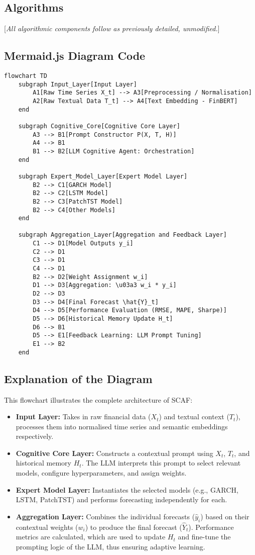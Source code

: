\documentclass[conference]{IEEEtran}
\begin{document}
\subsection{Algorithms}
[\emph{All algorithmic components follow as previously detailed, unmodified.}]

\subsection{Mermaid.js Diagram Code}
\begin{verbatim}
flowchart TD
    subgraph Input_Layer[Input Layer]
        A1[Raw Time Series X_t] --> A3[Preprocessing / Normalisation]
        A2[Raw Textual Data T_t] --> A4[Text Embedding - FinBERT]
    end

    subgraph Cognitive_Core[Cognitive Core Layer]
        A3 --> B1[Prompt Constructor P(X, T, H)]
        A4 --> B1
        B1 --> B2[LLM Cognitive Agent: Orchestration]
    end

    subgraph Expert_Model_Layer[Expert Model Layer]
        B2 --> C1[GARCH Model]
        B2 --> C2[LSTM Model]
        B2 --> C3[PatchTST Model]
        B2 --> C4[Other Models]
    end

    subgraph Aggregation_Layer[Aggregation and Feedback Layer]
        C1 --> D1[Model Outputs y_i]
        C2 --> D1
        C3 --> D1
        C4 --> D1
        B2 --> D2[Weight Assignment w_i]
        D1 --> D3[Aggregation: \u03a3 w_i * y_i]
        D2 --> D3
        D3 --> D4[Final Forecast \hat{Y}_t]
        D4 --> D5[Performance Evaluation (RMSE, MAPE, Sharpe)]
        D5 --> D6[Historical Memory Update H_t]
        D6 --> B1
        D5 --> E1[Feedback Learning: LLM Prompt Tuning]
        E1 --> B2
    end
\end{verbatim}

\subsection{Explanation of the Diagram}
This flowchart illustrates the complete architecture of SCAF:
\begin{itemize}
    \item \textbf{Input Layer:} Takes in raw financial data ($X_t$) and textual context ($T_t$), processes them into normalised time series and semantic embeddings respectively.
    \item \textbf{Cognitive Core Layer:} Constructs a contextual prompt using $X_t$, $T_t$, and historical memory $H_t$. The LLM interprets this prompt to select relevant models, configure hyperparameters, and assign weights.
    \item \textbf{Expert Model Layer:} Instantiates the selected models (e.g., GARCH, LSTM, PatchTST) and performs forecasting independently for each.
    \item \textbf{Aggregation Layer:} Combines the individual forecasts ($\hat{y}_i$) based on their contextual weights ($w_i$) to produce the final forecast ($\hat{Y}_t$). Performance metrics are calculated, which are used to update $H_t$ and fine-tune the prompting logic of the LLM, thus ensuring adaptive learning.
\end{itemize}
\end{document}
